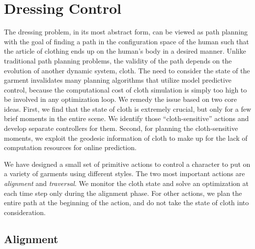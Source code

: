 \section{Dressing Control}

The dressing problem, in its most abstract form, can be viewed as path planning with the goal of finding a path in the configuration space of the human such that the article of clothing ends up on the human's body in a desired manner. Unlike traditional path planning problems, the validity of the path depends on the evolution of another dynamic system, cloth. The need to consider the state of the garment invalidates many planning algorithms that utilize model predictive control, because the computational cost of cloth simulation is simply too high to be involved in any optimization loop. We remedy the issue based on two core ideas. First, we find that the state of cloth is extremely crucial, but only for a few brief moments in the entire scene. We identify those ``cloth-sensitive'' actions and develop separate controllers for them. Second, for planning the cloth-sensitive moments, we exploit the geodesic information of cloth to make up for the lack of computation resources for online prediction.

We have designed a small set of primitive actions to control a character to put on a variety of garments using different styles. The two most important actions are \emph{alignment} and \emph{traversal}. We monitor the cloth state and solve an optimization at each time step only during the alignment phase. For other actions, we plan the entire path at the beginning of the action, and do not take the state of cloth into consideration.



\subsection{Alignment}

